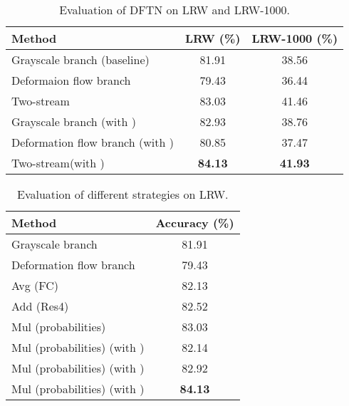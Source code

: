 \documentclass[a4paper, 10pt, conference]{ieeeconf}      \usepackage{FG2020}
\begin{document}
   
   \


\begin{table}
     \caption{Evaluation of DFTN on LRW and LRW-1000.  }
      \label{tab:result_all}
      \begin{center}
      \begin{tabular}{|l|c|c|}
      \hline
      Method & LRW (\%) & LRW-1000 (\%) \\
      \hline\hline
      Grayscale branch (baseline) & 81.91 & 38.56\\
      Deformaion flow branch & 79.43 & 36.44\\
Two-stream & 83.03 & 41.46\\
      Grayscale branch (with )&82.93 & 38.76\\
      Deformation flow branch (with )& 80.85 & 37.47\\
Two-stream(with ) & \textbf{84.13 }& \textbf{41.93}\\
      \hline
      \end{tabular}
      \end{center}
      \vspace{-0.4cm}
      \end{table}


\begin{table}
         \caption{Evaluation of different strategies on LRW.   }
          \label{tab:result_ablation}
          \begin{center}
          \begin{tabular}{|l|c|}
          \hline
          Method & Accuracy (\%) \\
          \hline\hline
          Grayscale branch & 81.91 \\
          Deformation flow branch & 79.43 \\
          Avg (FC) & 82.13\\
          Add (Res4)  & 82.52\\
          Mul (probabilities) & 83.03\\
          Mul (probabilities) (with )&82.14\\
          Mul (probabilities) (with )& 82.92\\
          Mul (probabilities) (with )& \textbf{84.13}  \\
          \hline
          \end{tabular}
          \end{center}
          \vspace{-0.4cm}
          \end{table}
\end{document}

